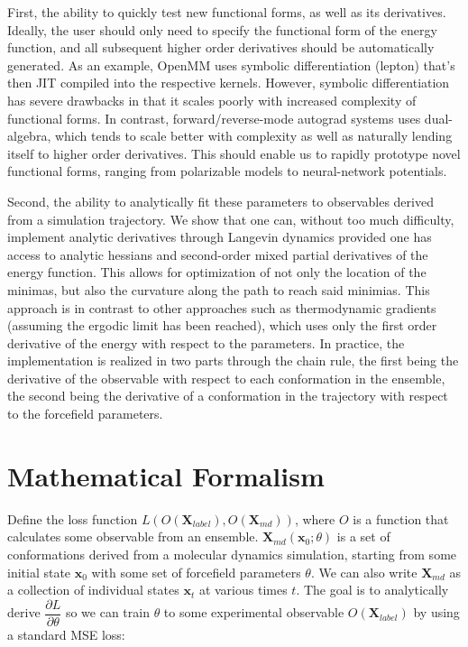\documentclass{article}
\begin{document}
First, the ability to quickly test new functional forms, as well as its derivatives. Ideally, the user should only need to specify the functional form of the energy function, and all subsequent higher order derivatives should be automatically generated. As an example, OpenMM uses symbolic differentiation (lepton) that's then JIT compiled into the respective kernels. However, symbolic differentiation has severe drawbacks in that it scales poorly with increased complexity of functional forms. In contrast, forward/reverse-mode autograd systems uses dual-algebra, which tends to scale better with complexity as well as naturally lending itself to higher order derivatives. This should enable us to rapidly prototype novel functional forms, ranging from polarizable models to neural-network potentials.

Second, the ability to analytically fit these parameters to observables derived from a simulation trajectory. We show that one can, without too much difficulty, implement analytic derivatives through Langevin dynamics provided one has access to analytic hessians and second-order mixed partial derivatives of the energy function. This allows for optimization of not only the location of the minimas, but also the curvature along the path to reach said minimias. This approach is in contrast to other approaches such as thermodynamic gradients (assuming the ergodic limit has been reached), which uses only the first order derivative of the energy with respect to the parameters. In practice, the implementation is realized in two parts through the chain rule, the first being the derivative of the observable with respect to each conformation in the ensemble, the second being the derivative of a conformation in the trajectory with respect to the forcefield parameters.

\section{Mathematical Formalism}

Define the loss function $L(O(\bm{X}_{label}), O(\bm{X}_{md}))$, where $O$ is a function that calculates some observable from an ensemble. $\bm{X}_{md}(\bm{x}_0; \theta)$ is a set of conformations derived from a molecular dynamics simulation, starting from some initial state $\bm{x}_0$ with some set of forcefield parameters $\theta$. We can also write $\bm{X}_{md}$ as a collection of individual states $\bm{x}_t$ at various times $t$. The goal is to analytically derive $\dfrac{\partial L}{\partial \theta}$ so we can train $\theta$ to some experimental observable $O(\bm{X}_{label})$ by using a standard MSE loss:
\end{document}
